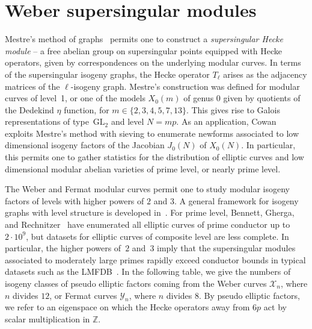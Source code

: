 \documentclass{amsart}
\newcommand{\cX}{\mathcal{X}}
\newcommand{\cY}{\mathcal{Y}}
\newcommand{\ZZ}{\mathbb{Z}}
\newcommand{\GL}{\mathrm{GL}}
\begin{document}
\section{Weber supersingular modules}

Mestre's method of graphs~\cite{Mestre86} permits one
to construct a {\it supersingular Hecke module} -- a free abelian
group on supersingular points equipped with Hecke operators,
given by correspondences on the underlying modular curves.
In terms of the supersingular isogeny graphs, the Hecke
operator $T_\ell$ arises as the adjacency matrices of
the $\ell$-isogeny graph.
Mestre's construction was defined for modular curves of level~1,
or one of the models $X_0(m)$ of genus $0$ given by quotients
of the Dedekind $\eta$ function, for $m \in \{2,3,4,5,7,13\}$.
This gives rise to Galois representations of type~$\GL_2$
and level $N = mp$.  As an application, Cowan~\cite{Cowan22}
exploits Mestre's method with sieving to enumerate
newforms associated to low dimensional isogeny factors of
the Jacobian $J_0(N)$ of $X_0(N)$.
In particular, this permits one to gather statistics for
the distribution of elliptic curves and low dimensional
modular abelian varieties of prime level, or nearly prime
level.

The Weber and Fermat modular curves permit one to study modular
isogeny factors of levels with higher powers of $2$ and $3$.
A general framework for isogeny graphs with level structure
is developed in~\cite{ModSS}.
For prime level, Bennett, Gherga, and Rechnitzer~\cite{BGR19}
have enumerated all elliptic curves of prime conductor up
to $2 \cdot 10^9$, but datasets for elliptic curves of composite
level are less complete.  In particular, the higher powers
of~$2$ and~$3$ imply that the supersingular modules associated
to moderately large primes rapidly exceed conductor bounds in
typical datasets such as the LMFDB~\cite{LMFDB}.
In the following table, we give the numbers of isogeny classes
of pseudo elliptic factors coming from the Weber curves $\cX_n$,
where $n$ divides $12$, or Fermat curves $\cY_n$, where $n$
divides $8$.  By pseudo elliptic factors, we refer to an
eigenspace on which the Hecke operators away from $6p$ act
by scalar multiplication in $\ZZ$.
\end{document}
